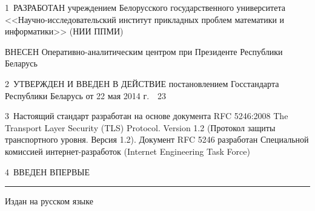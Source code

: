 \vskip0.2cm

1~РАЗРАБОТАН учреждением Белорусского государственного университета 
<<Науч\-но-исследовательский  институт прикладных проблем математики и 
информатики>> (НИИ ППМИ)

ВНЕСЕН Оперативно-аналитическим центром при Президенте Республики Беларусь 

2~УТВЕРЖДЕН И ВВЕДЕН В ДЕЙСТВИЕ постановлением Госстандарта Республики 
Беларусь от 22 мая 2014 г.~\No~23

3~Настоящий стандарт разработан на основе документа RFC 5246:2008 The 
Transport Layer Security (TLS) Protocol. Version 1.2 (Протокол защиты 
транспортного уровня. Версия 1.2). Документ RFC 5246 разработан 
Специальной комиссией интернет-разработок (Internet Engineering Task 
Force)

4~ВВЕДЕН ВПЕРВЫЕ

\vfill
\hrule
\vskip1mm
Издан на русском языке

\pagebreak

